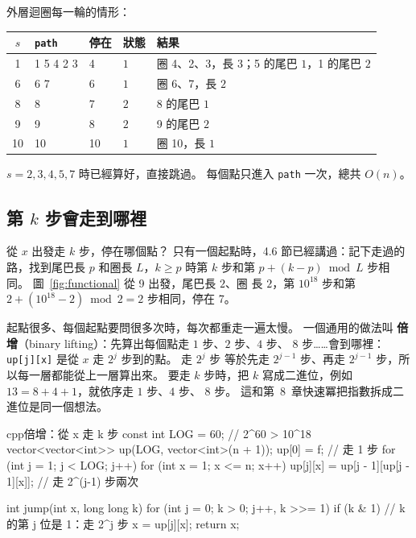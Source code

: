 
外層迴圈每一輪的情形：

\begin{center}
\begin{tabular}{cllll}
\toprule
$s$ & \texttt{path} & 停在 & 狀態 & 結果 \\
\midrule
1 & 1 5 4 2 3 & 4 & $1$ & 圈 4、2、3，長 $3$；5 的尾巴 $1$，1 的尾巴 $2$ \\
6 & 6 7 & 6 & $1$ & 圈 6、7，長 $2$ \\
8 & 8 & 7 & $2$ & 8 的尾巴 $1$ \\
9 & 9 & 8 & $2$ & 9 的尾巴 $2$ \\
10 & 10 & 10 & $1$ & 圈 10，長 $1$ \\
\bottomrule
\end{tabular}
\end{center}

$s = 2, 3, 4, 5, 7$ 時已經算好，直接跳過。 每個點只進入 \texttt{path} 一次，總共 $O(n)$。

\subsection{第 $k$ 步會走到哪裡}

從 $x$ 出發走 $k$ 步，停在哪個點？ 只有一個起點時，4.6 節已經講過：記下走過的
路，找到尾巴長 $p$ 和圈長 $L$，$k \ge p$ 時第 $k$ 步和第
$p + (k - p) \bmod L$ 步相同。 圖~\ref{fig:functional} 從 9 出發，尾巴長 $2$、圈
長 $2$，第 $10^{18}$ 步和第 $2 + (10^{18} - 2) \bmod 2 = 2$ 步相同，停在 7。

起點很多、每個起點要問很多次時，每次都重走一遍太慢。 一個通用的做法叫
\textbf{倍增}（binary lifting）：先算出每個點走 $1$ 步、$2$ 步、$4$ 步、
$8$ 步……會到哪裡：\texttt{up[j][x]} 是從 $x$ 走 $2^j$ 步到的點。 走 $2^j$ 步
等於先走 $2^{j-1}$ 步、再走 $2^{j-1}$ 步，所以每一層都能從上一層算出來。 要走
$k$ 步時，把 $k$ 寫成二進位，例如 $13 = 8 + 4 + 1$，就依序走 $1$ 步、$4$ 步、
$8$ 步。 這和第~8~章快速冪把指數拆成二進位是同一個想法。

\begin{code}{cpp}{倍增：從 x 走 k 步}
const int LOG = 60;                    // 2^60 > 10^18
vector<vector<int>> up(LOG, vector<int>(n + 1));
up[0] = f;                             // 走 1 步
for (int j = 1; j < LOG; j++) {
    for (int x = 1; x <= n; x++) {
        up[j][x] = up[j - 1][up[j - 1][x]];   // 走 2^(j-1) 步兩次
    }
}

int jump(int x, long long k) {
    for (int j = 0; k > 0; j++, k >>= 1) {
        if (k & 1) {                   // k 的第 j 位是 1：走 2^j 步
            x = up[j][x];
        }
    }
    return x;
}
\end{code}


